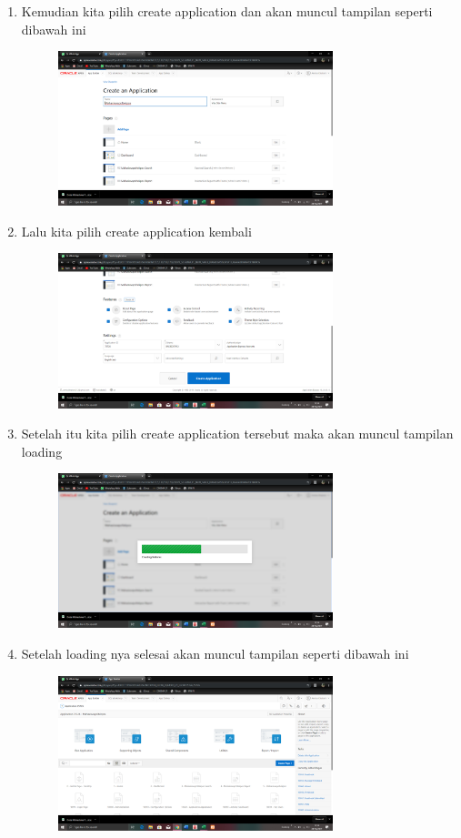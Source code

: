 \documentclass{article}
\begin{document}
\begin{enumerate}
\begin{figure}[h]
    \end{figure}
    \newpage \item Kemudian kita pilih create application dan akan muncul tampilan seperti dibawah ini
    \begin{figure}[h]
    \centerline{\includegraphics[width=8cm]{image/16.png}}
    \end{figure}
    \item Lalu kita pilih create application kembali
    \begin{figure}[h]
    \centerline{\includegraphics[width=8cm]{image/17.png}}
    \end{figure}
    \newpage\item Setelah itu kita pilih create application tersebut maka akan muncul tampilan loading
    \begin{figure}[h]
     \centerline{\includegraphics[width=8cm]{image/18.png}}
    \end{figure}
    \item Setelah loading nya selesai akan muncul tampilan seperti dibawah ini
    \begin{figure}[h]
    \centerline{\includegraphics[width=8cm]{image/19.png}}

\end{figure}
\end{enumerate}
\end{document}
